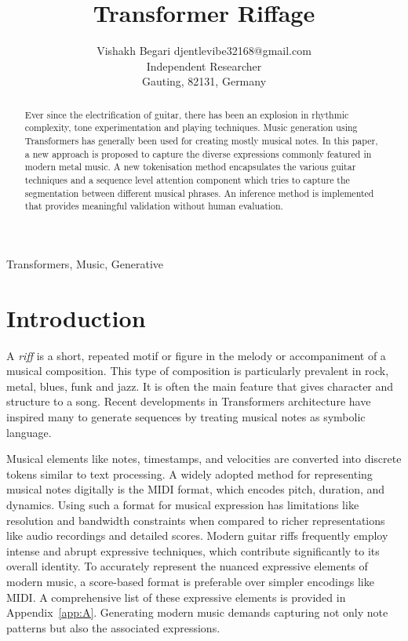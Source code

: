 \documentclass[twoside,11pt]{article}
\begin{document}
\title{Transformer Riffage}

\author{\name Vishakh Begari \email djentlevibe32168@gmail.com \\
       \addr Independent Researcher\\
       Gauting, 82131, Germany}


\maketitle

\begin{abstract}%
Ever since the electrification of guitar, there has been an explosion 
in rhythmic complexity, tone experimentation and playing techniques. Music 
generation using Transformers \cite{Vaswani2} has generally 
been used for creating mostly musical notes. In this paper, a new approach is proposed 
to capture the diverse expressions commonly featured in modern metal music. 
A new tokenisation method encapsulates the various guitar techniques and a sequence level attention component 
which tries to capture the segmentation between different musical phrases.
An inference method is implemented that provides meaningful validation without human evaluation.
\end{abstract}

\begin{keywords}
  Transformers, Music, Generative
\end{keywords}

\section{Introduction}
A \textit{riff} is a short, repeated motif or figure in the melody or accompaniment of a 
musical composition. \cite{randel:86} This type of composition is particularly prevalent 
in rock, metal, blues, funk and jazz. It is often the main feature that gives character 
and structure to a song. Recent developments in Transformers architecture have inspired 
many to generate sequences by treating musical notes as symbolic language. 

Musical elements like notes, timestamps, and velocities are converted into discrete tokens similar to 
text processing. \cite{aws_deepcomposer} A widely adopted method for representing musical notes digitally is the MIDI format, 
which encodes pitch, duration, and dynamics. Using such a format for musical expression has limitations like resolution 
and bandwidth constraints \cite{midi_short} when compared to richer representations like 
audio recordings and detailed scores. Modern guitar riffs frequently employ intense and abrupt expressive
techniques, which contribute significantly to its overall identity. To accurately represent the nuanced 
expressive elements of modern music, a score-based format is preferable over simpler encodings like MIDI.
A comprehensive list of these expressive elements is provided in Appendix~\ref{app:A}. Generating modern music 
demands capturing not only note patterns but also the associated expressions. 
\end{document}
